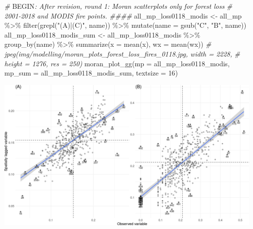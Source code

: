 \documentclass[10pt,landscape,a3paper]{article}
\newenvironment{Shaded}{\begin{snugshade}}{\end{snugshade}}
\newcommand{\AttributeTok}[1]{\textcolor[rgb]{0.77,0.63,0.00}{#1}}
\newcommand{\CommentTok}[1]{\textcolor[rgb]{0.56,0.35,0.01}{\textit{#1}}}
\newcommand{\DecValTok}[1]{\textcolor[rgb]{0.00,0.00,0.81}{#1}}
\newcommand{\FunctionTok}[1]{\textcolor[rgb]{0.00,0.00,0.00}{#1}}
\newcommand{\NormalTok}[1]{#1}
\newcommand{\OtherTok}[1]{\textcolor[rgb]{0.56,0.35,0.01}{#1}}
\newcommand{\RegionMarkerTok}[1]{#1}
\newcommand{\SpecialCharTok}[1]{\textcolor[rgb]{0.00,0.00,0.00}{#1}}
\newcommand{\StringTok}[1]{\textcolor[rgb]{0.31,0.60,0.02}{#1}}
\begin{document}
\begin{Shaded}
\begin{Highlighting}[]

\CommentTok{\# }\RegionMarkerTok{BEGIN}\CommentTok{: After revision, round 1: Moran scatterplots only for forest loss}
\CommentTok{\# 2001{-}2018 and MODIS fire points. \#\#\#\#}
\NormalTok{all\_mp\_loss0118\_modis }\OtherTok{\textless{}{-}}\NormalTok{ all\_mp }\SpecialCharTok{\%\textgreater{}\%}
    \FunctionTok{filter}\NormalTok{(}\FunctionTok{grepl}\NormalTok{(}\StringTok{"(A)|(C)"}\NormalTok{, name)) }\SpecialCharTok{\%\textgreater{}\%}
    \FunctionTok{mutate}\NormalTok{(}\AttributeTok{name =} \FunctionTok{gsub}\NormalTok{(}\StringTok{"C"}\NormalTok{, }\StringTok{"B"}\NormalTok{, name))}
\NormalTok{all\_mp\_loss0118\_modis\_sum }\OtherTok{\textless{}{-}}\NormalTok{ all\_mp\_loss0118\_modis }\SpecialCharTok{\%\textgreater{}\%}
    \FunctionTok{group\_by}\NormalTok{(name) }\SpecialCharTok{\%\textgreater{}\%}
    \FunctionTok{summarize}\NormalTok{(}\AttributeTok{x =} \FunctionTok{mean}\NormalTok{(x), }\AttributeTok{wx =} \FunctionTok{mean}\NormalTok{(wx))}
\CommentTok{\# jpeg(\textquotesingle{}img/modelling/moran\_plots\_forest\_loss\_fires\_0118.jpg\textquotesingle{}, width = 2228,}
\CommentTok{\# height = 1276, res = 250)}
\FunctionTok{moran\_plot\_gg}\NormalTok{(}\AttributeTok{mp =}\NormalTok{ all\_mp\_loss0118\_modis, }\AttributeTok{mp\_sum =}\NormalTok{ all\_mp\_loss0118\_modis\_sum, }\AttributeTok{textsize =} \DecValTok{16}\NormalTok{)}
\end{Highlighting}
\end{Shaded}

\begin{center}\includegraphics{img/modelling/lta-esda-7} \end{center}
\end{document}
